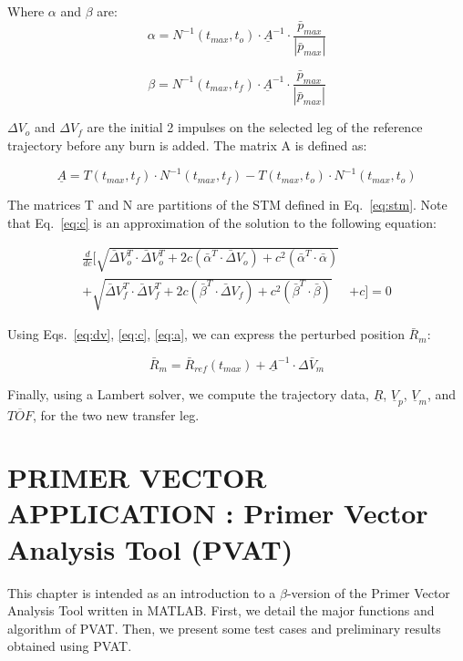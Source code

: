 \documentclass[12pt]{report}
\newcommand{\MT}{MATLAB}
\begin{document}
\noindent Where $\alpha$ and $\beta$ are:
\begin{equation}
\alpha = N^{-1}(t_{max},t_{o}) \cdot \underline{A}^{-1} \cdot
\frac{\bar p_{max}}{|\bar p_{max}|}
\end{equation}

\begin{equation}
\beta = N^{-1}(t_{max},t_{f}) \cdot \underline{A}^{-1} \cdot
\frac{\bar p_{max}}{|\bar p_{max}|}
\end{equation}


\noindent $\Delta V_{o}$ and $\Delta V_{f}$ are the initial 2
impulses on the selected leg of the reference trajectory before
any burn is added. The matrix A is defined as:

\begin{equation}
\underline{A} = T(t_{max},t_{f}) \cdot N^{-1}(t_{max},t_{f}) -
T(t_{max},t_{o}) \cdot N^{-1}(t_{max},t_{o}) \label{eq:a}
\end{equation}

\noindent The matrices T and N are partitions of the STM defined
in Eq.~\ref{eq:stm}. Note that Eq.~\ref{eq:c} is an approximation
of the solution to the following equation:


\begin{eqnarray}
\frac{d}{dc}[\sqrt{\bar \Delta V_{o}^{T} \cdot \bar \Delta
V_{o}^{T} + 2c(\bar\alpha^{T}\cdot \bar \Delta V_{o}) + c^{2}
(\bar\alpha^{T}\cdot\bar\alpha)}\\
+\sqrt{\bar \Delta V_{f}^{T} \cdot \bar \Delta V_{f}^{T} +
2c(\bar\beta^{T}\cdot \bar \Delta V_{f})+c^{2}
(\bar\beta^{T}\cdot\bar\beta)}& +c ]=0 \nonumber \label{eq:ceq}
\end{eqnarray}

\noindent Using Eqs.~\ref{eq:dv}, \ref{eq:c}, \ref{eq:a}, we can
express the perturbed position $\bar R_{m}$:

\begin{equation}
\bar R_{m} = \bar R_{ref}(t_{max}) + \underline{A}^{-1} \cdot
\Delta \bar V_{m} \label{eq:Rpert}
\end{equation}

\noindent Finally, using a Lambert solver, we compute the
trajectory data, $\underline{R}$, $\underline{V}_{p}$,
$\underline{V}_{m}$, and $\overline{TOF}$, for the two new
transfer leg.



\chapter{PRIMER VECTOR APPLICATION : Primer Vector Analysis Tool
(PVAT)}\label{chp:pvat} This chapter is intended as an
introduction to a $\beta$-version of the Primer Vector Analysis
Tool written in \MT. First, we detail the major functions and
algorithm of PVAT. Then, we present some test cases and
preliminary results obtained using PVAT.
\end{document}
